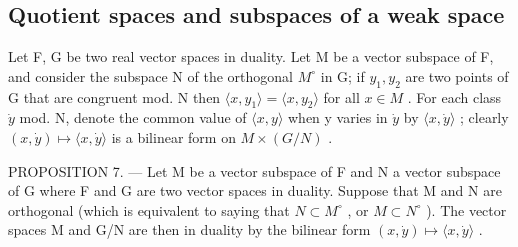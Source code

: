 \subsection{Quotient spaces and subspaces of a weak space}

Let F, G be two real vector spaces in duality. Let M be a vector subspace of F, and consider the subspace N of the orthogonal \(M^{\circ}\) in G; if \(y_{1}, y_{2}\) are two points of G that are congruent mod. N then \(\langle x, y_{1} \rangle = \langle x, y_{2} \rangle\) for all \(x \in M\) . For each class \(\dot{y}\) mod. N, denote the common value of \(\langle x, y \rangle\) when y varies in \(\dot{y}\) by \(\langle x, \dot{y} \rangle\) ; clearly \((x, \dot{y}) \mapsto \langle x, \dot{y} \rangle\) is a bilinear form on \(M \times (G/N)\) .

PROPOSITION 7. --- Let M be a vector subspace of F and N a vector subspace of G where F and G are two vector spaces in duality. Suppose that M and N are orthogonal (which is equivalent to saying that \(N \subset M^{\circ}\) , or \(M \subset N^{\circ}\) ). The vector spaces M and G/N are then in duality by the bilinear form \((x, \dot{y}) \mapsto \langle x, \dot{y} \rangle\) .

